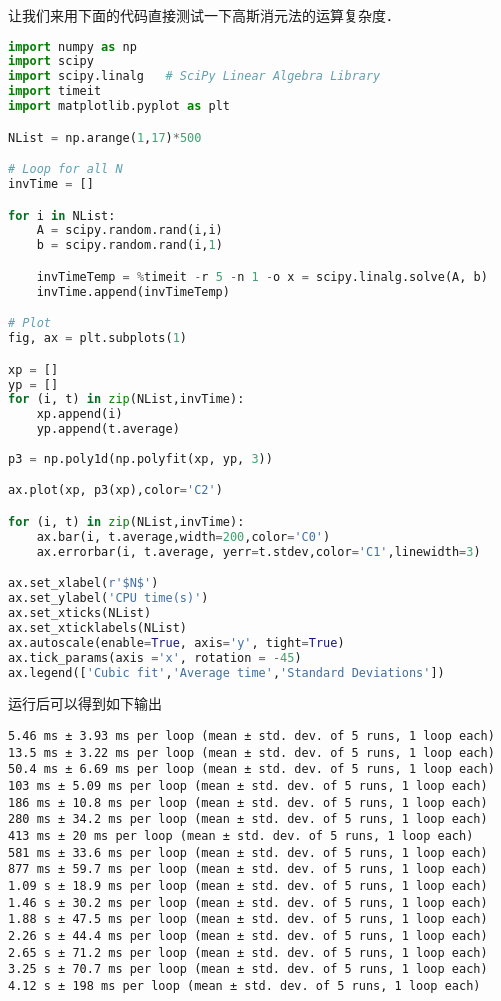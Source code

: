 让我们来用下面的代码直接测试一下高斯消元法的运算复杂度．
\begin{lstlisting}[language=python]
import numpy as np
import scipy
import scipy.linalg   # SciPy Linear Algebra Library
import timeit
import matplotlib.pyplot as plt

NList = np.arange(1,17)*500

# Loop for all N
invTime = []

for i in NList:
    A = scipy.random.rand(i,i)
    b = scipy.random.rand(i,1)

    invTimeTemp = %timeit -r 5 -n 1 -o x = scipy.linalg.solve(A, b)
    invTime.append(invTimeTemp)

# Plot
fig, ax = plt.subplots(1)

xp = []
yp = []
for (i, t) in zip(NList,invTime):
    xp.append(i)
    yp.append(t.average)
    
p3 = np.poly1d(np.polyfit(xp, yp, 3))

ax.plot(xp, p3(xp),color='C2')

for (i, t) in zip(NList,invTime):
    ax.bar(i, t.average,width=200,color='C0')
    ax.errorbar(i, t.average, yerr=t.stdev,color='C1',linewidth=3)

ax.set_xlabel(r'$N$')
ax.set_ylabel('CPU time(s)')
ax.set_xticks(NList)
ax.set_xticklabels(NList)
ax.autoscale(enable=True, axis='y', tight=True)
ax.tick_params(axis ='x', rotation = -45) 
ax.legend(['Cubic fit','Average time','Standard Deviations'])
\end{lstlisting}

运行后可以得到如下输出

\begin{lstlisting}[language=pythonC]
5.46 ms ± 3.93 ms per loop (mean ± std. dev. of 5 runs, 1 loop each)
13.5 ms ± 3.22 ms per loop (mean ± std. dev. of 5 runs, 1 loop each)
50.4 ms ± 6.69 ms per loop (mean ± std. dev. of 5 runs, 1 loop each)
103 ms ± 5.09 ms per loop (mean ± std. dev. of 5 runs, 1 loop each)
186 ms ± 10.8 ms per loop (mean ± std. dev. of 5 runs, 1 loop each)
280 ms ± 34.2 ms per loop (mean ± std. dev. of 5 runs, 1 loop each)
413 ms ± 20 ms per loop (mean ± std. dev. of 5 runs, 1 loop each)
581 ms ± 33.6 ms per loop (mean ± std. dev. of 5 runs, 1 loop each)
877 ms ± 59.7 ms per loop (mean ± std. dev. of 5 runs, 1 loop each)
1.09 s ± 18.9 ms per loop (mean ± std. dev. of 5 runs, 1 loop each)
1.46 s ± 30.2 ms per loop (mean ± std. dev. of 5 runs, 1 loop each)
1.88 s ± 47.5 ms per loop (mean ± std. dev. of 5 runs, 1 loop each)
2.26 s ± 44.4 ms per loop (mean ± std. dev. of 5 runs, 1 loop each)
2.65 s ± 71.2 ms per loop (mean ± std. dev. of 5 runs, 1 loop each)
3.25 s ± 70.7 ms per loop (mean ± std. dev. of 5 runs, 1 loop each)
4.12 s ± 198 ms per loop (mean ± std. dev. of 5 runs, 1 loop each)
\end{lstlisting}

